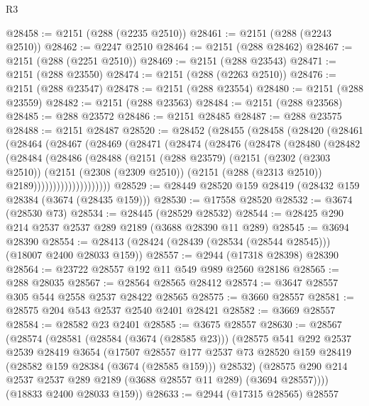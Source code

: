 \begin{lexlean}{R3}
\begin{coremodule}
@28458 := @2151 (@288 (@2235 @2510))
@28461 := @2151 (@288 (@2243 @2510))
@28462 := @2247 @2510
@28464 := @2151 (@288 @28462)
@28467 := @2151 (@288 (@2251 @2510))
@28469 := @2151 (@288 @23543)
@28471 := @2151 (@288 @23550)
@28474 := @2151 (@288 (@2263 @2510))
@28476 := @2151 (@288 @23547)
@28478 := @2151 (@288 @23554)
@28480 := @2151 (@288 @23559)
@28482 := @2151 (@288 @23563)
@28484 := @2151 (@288 @23568)
@28485 := @288 @23572
@28486 := @2151 @28485
@28487 := @288 @23575
@28488 := @2151 @28487
@28520 := @28452
    (@28455
      (@28458
        (@28420
          (@28461
            (@28464
              (@28467
                (@28469
                  (@28471
                    (@28474
                      (@28476
                        (@28478
                          (@28480
                            (@28482
                              (@28484
                                (@28486
                                  (@28488
                                    (@2151
                                      (@288 @23579)
                                      (@2151
                                        (@2302 (@2303 @2510))
                                        (@2151
                                          (@2308 (@2309 @2510))
                                          (@2151 (@288 (@2313 @2510)) @2189))))))))))))))))))))
@28529 := @28449 @28520 @159 @28419 (@28432 @159 @28384 (@3674 (@28435 @159)))
@28530 := @17558 @28520
@28532 := @3674 (@28530 @73)
@28534 := @28445 (@28529 @28532)
@28544 := @28425 @290 @214 @2537 @2537 @289 @2189 (@3688 @28390 @11 @289)
@28545 := @3694 @28390
@28554 := @28413 (@28424 (@28439 (@28534 (@28544 @28545))) (@18007 @2400 @28033 @159))
@28557 := @2944 (@17318 @28398) @28390
@28564 := @23722 @28557 @192 @11 @549 @989 @2560 @28186
@28565 := @288 @28035
@28567 := @28564 @28565 @28412
@28574 := @3647 @28557 @305 @544 @2558 @2537 @28422 @28565
@28575 := @3660 @28557
@28581 := @28575 @204 @543 @2537 @2540 @2401 @28421
@28582 := @3669 @28557
@28584 := @28582 @23 @2401
@28585 := @3675 @28557
@28630 := @28567
    (@28574
      (@28581
        (@28584 (@3674 (@28585 @23)))
        (@28575
          @541
          @292
          @2537
          @2539
          @28419
          @3654
          (@17507
            @28557
            @177
            @2537
            @73
            @28520
            @159
            @28419
            (@28582 @159 @28384 (@3674 (@28585 @159)))
            @28532)
          (@28575 @290 @214 @2537 @2537 @289 @2189 (@3688 @28557 @11 @289) (@3694 @28557))))
      (@18833 @2400 @28033 @159))
@28633 := @2944 (@17315 @28565) @28557

\end{coremodule}
\end{lexlean}
